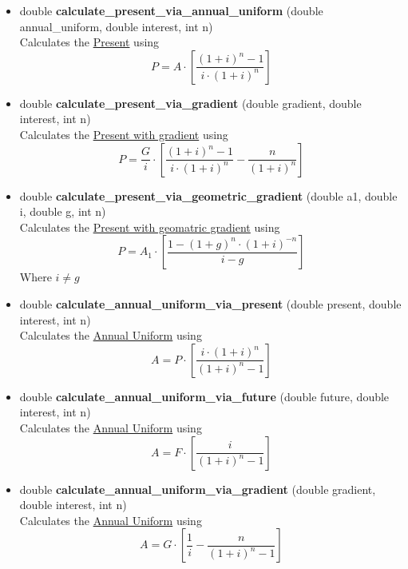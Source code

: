 \documentclass[english,12pt,a4paper,twoside,titlepage,leqno,fleqn]{article}
\begin{document}
\begin{enumerate}
\begin{enumerate}
\begin{itemize}
\vspace{1cm}

\item double {\bfseries calculate\_present\_via\_annual\_uniform} \small{(double annual\_uniform, double interest, int n)}\\
Calculates the \underline{Present} using\vspace{1cm} \[P = A\cdot\left[\frac{(1+i)^{n}-1}{i\cdot(1+i)^{n}}\right]\]\vspace{1cm}

\item double {\bfseries calculate\_present\_via\_gradient} \small{(double gradient, double interest, int n)}\\
Calculates the \underline{Present with gradient} using\vspace{1cm} \[P = \frac{G}{i}\cdot\left[\frac{(1+i)^{n}-1}{i\cdot(1+i)^{n}} - \frac{n}{(1+i)^{n}}\right]\]\vspace{1cm}

\item double {\bfseries calculate\_present\_via\_geometric\_gradient} \small{(double a1, double i, double g, int n)}\\
Calculates the \underline{Present with geomatric gradient} using\vspace{1cm} \[P = A_{1}\cdot\left[\frac{1-(1+g)^{n}\cdot(1+i)^{-n}}{i-g}\right]\] Where $i\neq g$\vspace{1cm}


\item double {\bfseries calculate\_annual\_uniform\_via\_present} \small{(double present, double interest, int n)}\\
Calculates the \underline{Annual Uniform} using\vspace{1cm} \[A = P\cdot\left[\frac{i\cdot(1+i)^{n}}{(1+i)^{n}-1}\right]\]\vspace{1cm}

\item double {\bfseries calculate\_annual\_uniform\_via\_future} \small{(double future, double interest, int n)}\\
Calculates the \underline{Annual Uniform} using\vspace{1cm} \[A = F\cdot\left[\frac{i}{(1+i)^{n}-1}\right]\]\vspace{1cm}

\item double {\bfseries calculate\_annual\_uniform\_via\_gradient} \small{(double gradient, double interest, int n)}\\
Calculates the \underline{Annual Uniform} using\vspace{1cm} \[A = G\cdot\left[\frac{1}{i}-\frac{n}{(1+i)^{n}-1}\right]\]\vspace{1cm}


\end{itemize}
\end{enumerate}
\end{enumerate}
\end{document}
